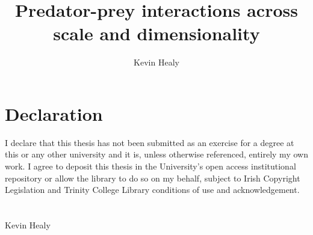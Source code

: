 \documentclass[twoside,12pt]{mythesis} %
\title{Predator-prey interactions across scale and dimensionality}
\author{Kevin Healy}
\begin{document}

\maketitle %

\chapter*{Declaration}
I declare that this thesis has not been submitted as an exercise for a degree at this or any other university and it is, unless otherwise referenced, entirely my own work.
I agree to deposit this thesis in the University's open access institutional repository or allow the library to do so on my behalf, subject to Irish Copyright Legislation and Trinity College Library conditions of use and acknowledgement.
\\
\\
\\
Kevin Healy


\vspace{10 mm}

\allcontents %
\cleardoublepage
\mainbody


		


 





\formatappendices


\end{document}
